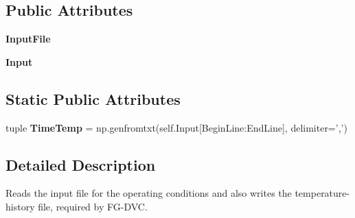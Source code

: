 \subsection*{\-Public \-Attributes}
\begin{DoxyCompactItemize}
\item 
\hypertarget{classInformationFiles_1_1OperCondInput_adeaba3436443e37d67a422b2e567c0a9}{{\bfseries \-Input\-File}}\label{classInformationFiles_1_1OperCondInput_adeaba3436443e37d67a422b2e567c0a9}

\item 
\hypertarget{classInformationFiles_1_1OperCondInput_ab57a754cfdf444860a808eb0dc149691}{{\bfseries \-Input}}\label{classInformationFiles_1_1OperCondInput_ab57a754cfdf444860a808eb0dc149691}

\end{DoxyCompactItemize}
\subsection*{\-Static \-Public \-Attributes}
\begin{DoxyCompactItemize}
\item 
\hypertarget{classInformationFiles_1_1OperCondInput_a5a172e0266c4c4940cba6147b66c84cf}{tuple {\bfseries \-Time\-Temp} = np.\-genfromtxt(self.\-Input\mbox{[}\-Begin\-Line\-:\-End\-Line\mbox{]}, delimiter=',')}\label{classInformationFiles_1_1OperCondInput_a5a172e0266c4c4940cba6147b66c84cf}

\end{DoxyCompactItemize}


\subsection{\-Detailed \-Description}
\begin{DoxyVerb}Reads the input file for the operating conditions and also writes the temperature-history file, required by FG-DVC.\end{DoxyVerb}
 

